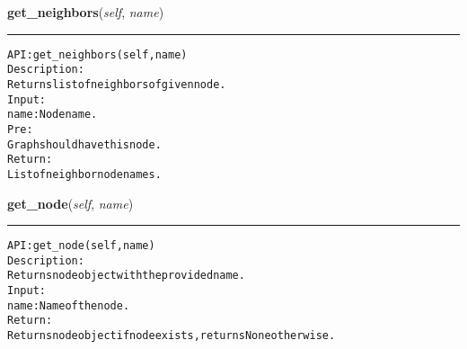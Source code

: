     \label{coinor:gimpy:graph:Graph:get_neighbors}

    \vspace{0.5ex}

\hspace{.8\funcindent}\begin{boxedminipage}{\funcwidth}

    \raggedright \textbf{get\_neighbors}(\textit{self}, \textit{name})

    \vspace{-1.5ex}

    \rule{\textwidth}{0.5\fboxrule}
\setlength{\parskip}{2ex}
\begin{alltt}

API: get\_neighbors(self, name)
Description:
Returns list of neighbors of given node.
Input:
    name: Node name.
Pre:
    Graph should have this node.
Return:
    List of neighbor node names.
\end{alltt}

\setlength{\parskip}{1ex}
    \end{boxedminipage}

    \label{coinor:gimpy:graph:Graph:get_node}

    \vspace{0.5ex}

\hspace{.8\funcindent}\begin{boxedminipage}{\funcwidth}

    \raggedright \textbf{get\_node}(\textit{self}, \textit{name})

    \vspace{-1.5ex}

    \rule{\textwidth}{0.5\fboxrule}
\setlength{\parskip}{2ex}
\begin{alltt}

API: get\_node(self, name)
Description:
Returns node object with the provided name.
Input:
    name: Name of the node.
Return:
    Returns node object if node exists, returns None otherwise.
\end{alltt}

\setlength{\parskip}{1ex}
    \end{boxedminipage}

